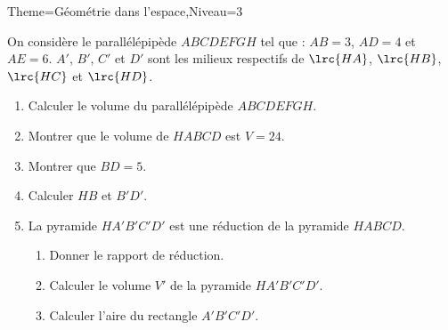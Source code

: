 \documentclass[a4paper,12pt]{article}
\begin{document}
\begin{Maquette}[Fiche]{Theme=Géométrie dans l'espace,Niveau=3}
\begin{exercice}
\begin{minipage}{0.5\linewidth}
On considère le parallélépipède $ABCDEFGH$ tel que : $AB=3$, $AD=4$ et $AE=6$.
$A'$, $B'$, $C'$ et $D'$ sont  les milieux respectifs de $\lrc{HA}$, $\lrc{HB}$, $\lrc{HC}$ et $\lrc{HD}$.
\begin{enumerate}
\item Calculer le volume du parallélépipède $ABCDEFGH$.
\item Montrer que le volume de $HABCD$ est $V=24$.
\item Montrer que $BD=5$.
\item Calculer $HB$ et $B'D'$.
\item La pyramide $HA'B'C'D'$ est une réduction de la pyramide $HABCD$.
\begin{enumerate}
\item Donner le rapport de réduction.
\item Calculer le volume $V'$ de la pyramide $HA'B'C'D'$.
\item Calculer l'aire du rectangle $A'B'C'D'$.
\end{enumerate}
\end{enumerate}
\end{minipage}%
\begin{minipage}{0.5\linewidth}
\end{minipage}
\end{exercice}























\end{Maquette}
\end{document}
